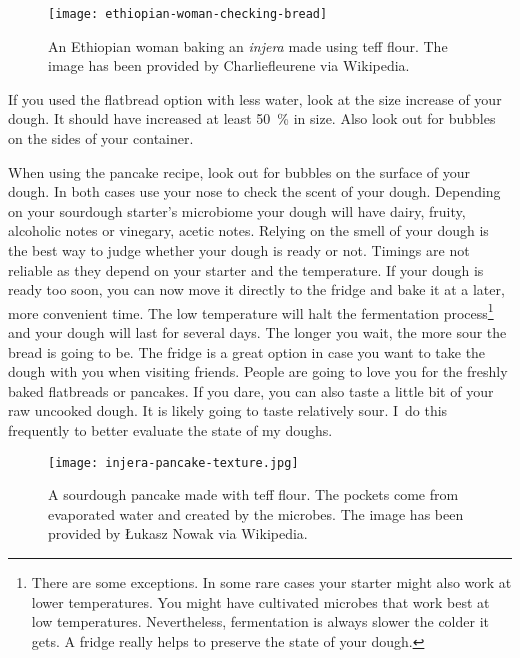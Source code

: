 \begin{figure}[htb]
\begin{center}
  \texttt{[image: ethiopian-woman-checking-bread]}
  \caption[Ethiopian \emph{injera}]{An Ethiopian woman baking an \emph{injera}
      made using teff flour.  The image has been provided by Charliefleurene
      via Wikipedia.}
\end{center}
\end{figure}

If you used the flatbread option with less water, look at the size increase
of your dough. It should have increased at least \qty{50}{\percent} in size.
Also look out for bubbles on the sides of your container.

When using the pancake recipe, look out for bubbles on the surface of your dough.
In both cases use your nose to check the scent of your dough. Depending
on your sourdough starter's microbiome your dough will have
dairy, fruity, alcoholic notes or vinegary, acetic notes. Relying
on the smell of your dough is the best way to judge whether your
dough is ready or not. Timings are not reliable as they
depend on your starter and the temperature. If your dough
is ready too soon, you can now move it directly to the fridge and bake
it at a later, more convenient time. The low temperature will halt the fermentation
process\footnote{There are some exceptions. In some rare cases your starter
might also work at lower temperatures. You might have cultivated microbes that work best at
low temperatures. Nevertheless, fermentation
is always slower the colder it gets. A fridge really helps to preserve the state
of your dough.}
and your dough will last for several days. The longer you wait, the more sour the
bread is going to be. The fridge is a great option in case you want to
take the dough with you when visiting friends. People are going
to love you for the freshly baked flatbreads or pancakes. If you dare,
you can also taste a little bit of your raw uncooked dough. It is likely
going to taste relatively sour. I~do this frequently to better evaluate the
state of my doughs.

\begin{figure}[!htb]
\begin{center}
  \texttt{[image: injera-pancake-texture.jpg]}
  \caption[Teff sourdough pancake]{A sourdough pancake made with teff flour.
      The pockets come from evaporated water and  created by the
      microbes.  The image has been provided by Łukasz Nowak via Wikipedia.}
\end{center}
\end{figure}

